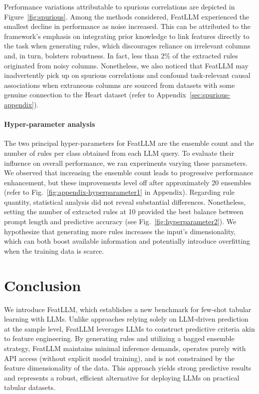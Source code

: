 Performance variations attributable to spurious correlations are depicted in Figure~\ref{fig:spurious}. Among the methods considered, \textsf{FeatLLM} experienced the smallest decline in performance as noise increased. This can be attributed to the framework’s emphasis on integrating prior knowledge to link features directly to the task when generating rules, which discourages reliance on irrelevant columns and, in turn, bolsters robustness. In fact, less than 2\% of the extracted rules originated from noisy columns. Nonetheless, we also noticed that \textsf{FeatLLM} may inadvertently pick up on spurious correlations and confound task-relevant causal associations when extraneous columns are sourced from datasets with some genuine connection to the Heart dataset (refer to Appendix~\ref{sec:spurious-appendix}).

\vspace*{-0.12in}
\paragraph{Hyper-parameter analysis}
The two principal hyper-parameters for \textsf{FeatLLM} are the ensemble count and the number of rules per class obtained from each LLM query. To evaluate their influence on overall performance, we ran experiments varying these parameters. We observed that increasing the ensemble count leads to progressive performance enhancement, but these improvements level off after approximately 20 ensembles (refer to Fig.~\ref{fig:appendix-hyperparameter1} in Appendix). Regarding rule quantity, statistical analysis did not reveal substantial differences. Nonetheless, setting the number of extracted rules at 10 provided the best balance between prompt length and predictive accuracy (see Fig.~\ref{fig:hyperparameter2}). We hypothesize that generating more rules increases the input's dimensionality, which can both boost available information and potentially introduce overfitting when the training data is scarce.

\section{Conclusion}
We introduce \textsf{FeatLLM}, which establishes a new benchmark for few-shot tabular learning with LLMs. Unlike approaches relying solely on LLM-driven prediction at the sample level, \textsf{FeatLLM} leverages LLMs to construct predictive criteria akin to feature engineering. By generating rules and utilizing a bagged ensemble strategy, \textsf{FeatLLM} maintains minimal inference demands, operates purely with API access (without explicit model training), and is not constrained by the feature dimensionality of the data. This approach yields strong predictive results and represents a robust, efficient alternative for deploying LLMs on practical tabular datasets.

